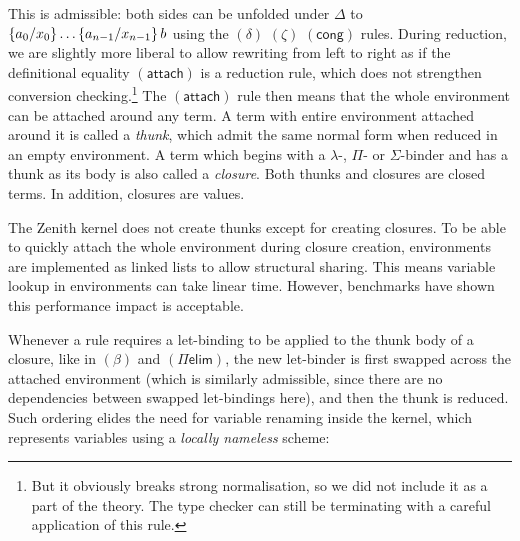 \documentclass[twoside]{report}
\begin{document}
This is admissible: both sides can be unfolded under $\Delta$ to $\subst {x_0} {a_0} {\ldots \subst {x_{n-1}} {a_{n-1}} b}$ using the $(\delta)$ $(\zeta)$ $(\mathsf{cong})$ rules. During reduction, we are slightly more liberal to allow rewriting from left to right as if the definitional equality $(\mathsf{attach})$ is a reduction rule, which does not strengthen conversion checking.\footnote{But it obviously breaks strong normalisation, so we did not include it as a part of the theory. The type checker can still be terminating with a careful application of this rule.} The $(\mathsf{attach})$ rule then means that the whole environment can be attached around any term. A term with entire environment attached around it is called a \emph{thunk}, which admit the same normal form when reduced in an empty environment. A term which begins with a $\lambda$-, $\Pi$- or $\Sigma$-binder and has a thunk as its body is also called a \emph{closure}. Both thunks and closures are closed terms. In addition, closures are values.

The Zenith kernel does not create thunks except for creating closures. To be able to quickly attach the whole environment during closure creation, environments are implemented as linked lists to allow structural sharing. This means variable lookup in environments can take linear time. However, benchmarks have shown this performance impact is acceptable.

Whenever a rule requires a let-binding to be applied to the thunk body of a closure, like in $(\mathsf{\beta})$ and $(\Pi\mathsf{elim})$, the new let-binder is first swapped across the attached environment (which is similarly admissible, since there are no dependencies between swapped let-bindings here), and then the thunk is reduced. Such ordering elides the need for variable renaming inside the kernel, which represents variables using a \emph{locally nameless} scheme: %
\end{document}
